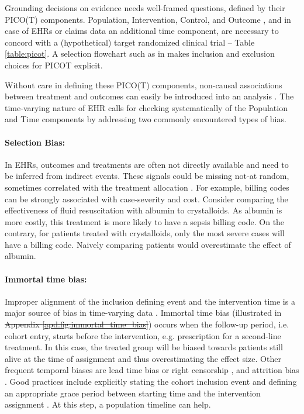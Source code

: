 \documentclass[10pt,letterpaper]{article}
\providecommand{\DIFaddtex}[1]{{\protect\color{blue}\uwave{#1}}} %
\providecommand{\DIFdeltex}[1]{{\protect\color{red}\sout{#1}}}                      %
\providecommand{\DIFaddbegin}{} %
\providecommand{\DIFaddend}{} %
\providecommand{\DIFdelbegin}{} %
\providecommand{\DIFdelend}{} %
\providecommand{\DIFadd}[1]{\texorpdfstring{\DIFaddtex{#1}}{#1}} %
\providecommand{\DIFdel}[1]{\texorpdfstring{\DIFdeltex{#1}}{}} %
\newcommand{\DIFscaledelfig}{0.5}
\newlength{\DIFdelgraphicswidth} %
\newlength{\DIFdelgraphicsheight} %
\newcommand{\DIFaddincludegraphics}[2][]{{\color{blue}\fbox{\DIFOincludegraphics[#1]{#2}}}} %
\newcommand{\DIFdelincludegraphics}[2][]{%
\sbox{\DIFdelgraphicsbox}{\DIFOincludegraphics[#1]{#2}}%
\settoboxwidth{\DIFdelgraphicswidth}{\DIFdelgraphicsbox} %
\settoboxtotalheight{\DIFdelgraphicsheight}{\DIFdelgraphicsbox} %
\scalebox{\DIFscaledelfig}{%
\parbox[b]{\DIFdelgraphicswidth}{\usebox{\DIFdelgraphicsbox}\\[-\baselineskip] \rule{\DIFdelgraphicswidth}{0em}}\llap{\resizebox{\DIFdelgraphicswidth}{\DIFdelgraphicsheight}{%
\setlength{\unitlength}{\DIFdelgraphicswidth}%
\begin{picture}(1,1)%
\thicklines\linethickness{2pt} %
{\color[rgb]{1,0,0}\put(0,0){\framebox(1,1){}}}%
{\color[rgb]{1,0,0}\put(0,0){\line( 1,1){1}}}%
{\color[rgb]{1,0,0}\put(0,1){\line(1,-1){1}}}%
\end{picture}%
}\hspace*{3pt}}} %
} %
\DeclareRobustCommand{\DIFaddbegin}{\DIFOaddbegin \let\includegraphics\DIFaddincludegraphics} %
\DeclareRobustCommand{\DIFaddend}{\DIFOaddend \let\includegraphics\DIFOincludegraphics} %
\DeclareRobustCommand{\DIFdelbegin}{\DIFOdelbegin \let\includegraphics\DIFdelincludegraphics} %
\DeclareRobustCommand{\DIFdelend}{\DIFOaddend \let\includegraphics\DIFOincludegraphics} %
\begin{document}
Grounding decisions on evidence needs well-framed questions, defined by their
PICO(T) components. Population, Intervention, Control, and Outcome
\cite{richardson1995well,riva2012your}, and in case of EHRs or claims data an
additional time component, are necessary to concord with a (hypothetical) target
randomized clinical trial \cite{hernan_using_2016,wang2023emulation} -- Table
\ref{table:picot}. A selection flowchart such as in
\DIFdelbegin %
\DIFdelend \DIFaddbegin \DIFadd{S5 Fig }\DIFaddend makes inclusion and exclusion choices for PICOT explicit.

Without care in defining these PICO(T) components, non-causal associations
between treatment and outcomes can easily be introduced into an analysis
\cite{catalogofbias}. The time-varying nature of EHR calls for checking
systematically of the Population and Time components by addressing two commonly
encountered types of bias.


\paragraph{Selection Bias:} In EHRs, outcomes and treatments are often not
directly available and need to be inferred from indirect events. These signals
could be missing not-at random, sometimes correlated with the treatment
allocation \cite{weiskopf2023healthcare}. For example, billing codes can be
strongly associated with case-severity and cost. Consider comparing the
effectiveness of fluid resuscitation with albumin to crystalloids. As albumin is
more costly, this treatment is more likely to have a sepsis billing code. On the
contrary, for patients treated with crystalloids, only the most severe cases
will have a billing code. Naively comparing patients would overestimate the
effect of albumin.

\paragraph{Immortal time bias:} Improper alignment of the inclusion defining
event and the intervention time is a major source of bias in time-varying data
\cite{suissa2008immortal,hernan2016specifying,wang2022understanding}. Immortal time bias (illustrated in \DIFdelbegin \DIFdel{Appendix \ref{apd:fig:immortal_time_bias}}\DIFdelend \DIFaddbegin \DIFadd{S2 Fig}\DIFaddend ) occurs when the follow-up period,
i.e. cohort entry, starts before the intervention, e.g. prescription for a
second-line treatment. In this case, the treated group will be biased towards
patients still alive at the time of assignment and thus overestimating the
effect size. Other frequent temporal biases are lead time bias
\cite{Oke2021leadtimebias,fu2021timing} or right censorship  \cite{hernan2016specifying}, and attrition bias
\cite{Bankhead2017attritionbias}. Good
practices include explicitly stating the cohort inclusion event   \cite[Chapter~10:Defining Cohorts]{ohdsi2019book} and defining
an appropriate grace period between starting time and the intervention
assignment \cite{hernan2016specifying}. At this step, a population timeline can
help.
\end{document}
